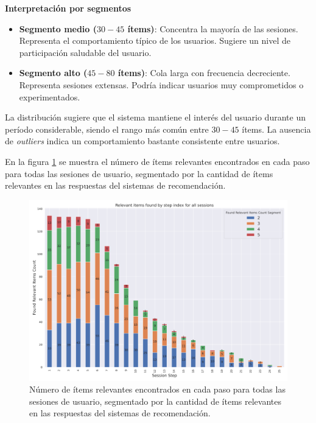 \documentclass[11pt,a4paper,twoside]{thesis}
\begin{document}
\textbf{Interpretación por segmentos}

\begin{itemize}
	\item \textbf{Segmento medio ($30-45$ ítems)}: Concentra la mayoría de las sesiones. Representa el comportamiento típico de los usuarios. Sugiere un nivel de participación saludable del usuario.
	\item \textbf{Segmento alto ($45-80$ ítems)}: Cola larga con frecuencia decreciente. Representa sesiones extensas. Podría indicar usuarios muy comprometidos o experimentados.
\end{itemize}

La distribución sugiere que el sistema mantiene el interés del usuario durante un período considerable, siendo el rango más común entre $30-45$ ítems. La ausencia de \textit{outliers} indica un comportamiento bastante consistente entre usuarios.

\clearpage

En la figura \ref{fig:llama2-relevant_items_found_by_step_index_for_all_sessions} se muestra el número de ítems relevantes encontrados en cada paso para todas las sesiones de usuario, segmentado por la cantidad de ítems relevantes en las respuestas del sistemas de recomendación.

\begin{figure}[H]
	\centering
	\includegraphics[width=15cm]{./images/llama2/relevant_items_found_by_step_index_for_all_sessions.png}
	\caption{Número de ítems relevantes encontrados en cada paso para todas las sesiones de usuario, segmentado por la cantidad de ítems relevantes en las respuestas del sistemas de recomendación.}
	\label{fig:llama2-relevant_items_found_by_step_index_for_all_sessions}
\end{figure}
\end{document}
